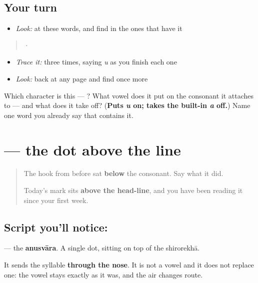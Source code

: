 \subsection*{Your turn}
\begin{itemize}
\raggedright
  \item \emph{Look:} at these words, and find  in the ones that have it
\end{itemize}

\begin{quote}
  ·  
\end{quote}

\begin{itemize}
\raggedright
  \item \emph{Trace it:}  three times, saying \emph{u} as you finish each one
  \item \emph{Look:} back at any page and find  once more
\end{itemize}

\begin{tcolorbox}[breakable,colback=teal!4,colframe=teal!35!black,title={Before you move on}]
Which character is this — ? What vowel does it put on the consonant it attaches to — and what does it take off? (\textbf{Puts \emph{u} on; takes the built-in \emph{a} off.}) Name one word you already say that contains it.
\end{tcolorbox}
\section[\texorpdfstring{\hi{ं} (ṃ)}{ं (ṃ)}]{ — the dot above the line}

\label{lesson:HI-S148-sign-anusvara}



\begin{quote}
The hook from before sat \textbf{below} the consonant. Say what it did.

Today's mark sits \textbf{above the head-line}, and you have been reading it since your first week.
\end{quote}

\subsection*{Script you'll notice: }
\textbf{} — the \textbf{anusvāra}. A single dot, sitting on top of the shirorekhā.

It sends the syllable \textbf{through the nose}. It is not a vowel and it does not replace one: the vowel stays exactly as it was, and the air changes route.

